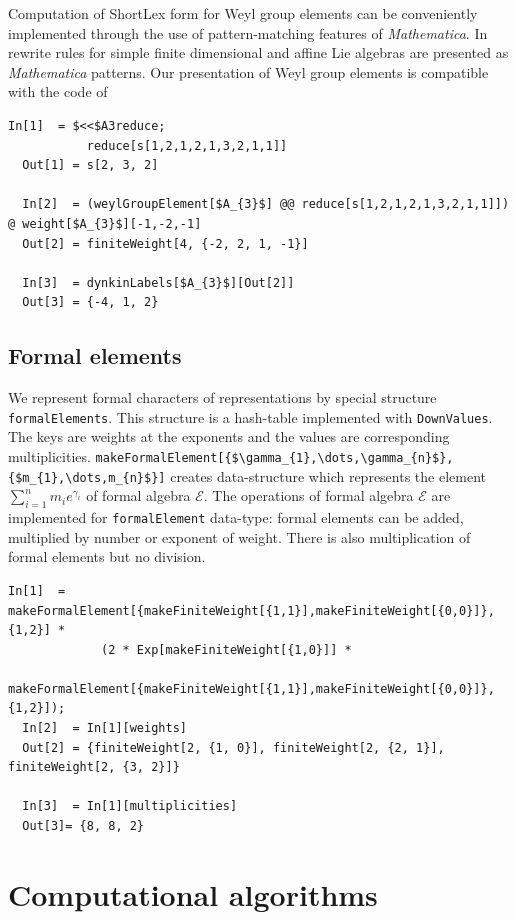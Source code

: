 \documentclass[preprint,12pt]{elsarticle}
\begin{document}
Computation of ShortLex form \cite{casselman1994machine,casselman1995automata} for Weyl group elements can be conveniently implemented through the use of pattern-matching features of {\it Mathematica}. In \cite{KallenShortlex} rewrite rules for simple finite dimensional and affine Lie algebras are presented as {\it Mathematica} patterns. Our presentation of Weyl group elements is compatible with the code of \cite{KallenShortlex}
\begin{lstlisting}[mathescape=true]
  In[1]  = $<<$A3reduce;
           reduce[s[1,2,1,2,1,3,2,1,1]]
  Out[1] = s[2, 3, 2]

  In[2]  = (weylGroupElement[$A_{3}$] @@ reduce[s[1,2,1,2,1,3,2,1,1]]) @ weight[$A_{3}$][-1,-2,-1]
  Out[2] = finiteWeight[4, {-2, 2, 1, -1}]

  In[3]  = dynkinLabels[$A_{3}$][Out[2]]
  Out[3] = {-4, 1, 2}
\end{lstlisting}

\subsection{Formal elements}
\label{sec:formal-elements}

We represent formal characters of representations by special structure \lstinline{formalElements}. This structure is a hash-table implemented with \lstinline{DownValues}. The keys are weights at the exponents and the values are corresponding multiplicities. \lstinline[mathescape=true]!makeFormalElement[{$\gamma_{1},\dots,\gamma_{n}$},{$m_{1},\dots,m_{n}$}]! creates data-structure which represents the element $\sum_{i=1}^{n} m_{i} e^{\gamma_{i}}$ of formal algebra $\mathcal{E}$. The operations of formal algebra $\mathcal{E}$ are implemented for \lstinline{formalElement} data-type: formal elements can be added, multiplied by number or exponent of weight. There is also multiplication of formal elements but no division.
\begin{lstlisting}[mathescape=true]
  In[1]  = makeFormalElement[{makeFiniteWeight[{1,1}],makeFiniteWeight[{0,0}]},{1,2}] *
             (2 * Exp[makeFiniteWeight[{1,0}]] *
             makeFormalElement[{makeFiniteWeight[{1,1}],makeFiniteWeight[{0,0}]},{1,2}]);
  In[2]  = In[1][weights]
  Out[2] = {finiteWeight[2, {1, 0}], finiteWeight[2, {2, 1}], finiteWeight[2, {3, 2}]}

  In[3]  = In[1][multiplicities]
  Out[3]= {8, 8, 2}
\end{lstlisting}

\section{Computational algorithms}
\label{sec:comp-algor}
\end{document}
